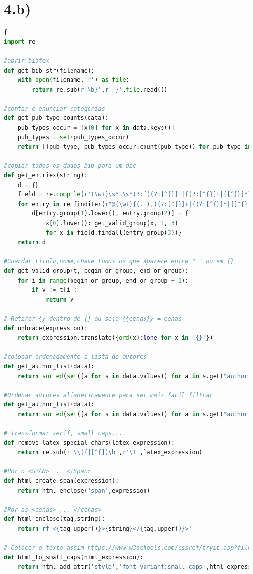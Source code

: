 \documentclass[11pt,a4paper]{report}
\begin{document}
\section{4.b)}
\begin{lstlisting}[language=python]{
import re

#abrir bibtex
def get_bib_str(filename):
    with open(filename,'r') as file:
        return re.sub(r'\b}',r' }',file.read())

#contar e enunciar categorias
def get_pub_type_counts(data):
    pub_types_occur = [x[0] for x in data.keys()]
    pub_types = set(pub_types_occur)
    return [(pub_type, pub_types_occur.count(pub_type)) for pub_type in pub_types]

#copiar todos os dados bib para um dic
def get_entries(string):
    d = {}
    field = re.compile(r'(\w+)\s*=\s*(?:{((?:[^{}]+|{(?:[^{}]+|{[^{}]*})+})+)}|"([^"]+)"|(\d+))')
    for entry in re.finditer(r"@(\w+){(.+),((?:[^{}]+|{(?:[^{}]*|{[^{}]*})+})+)", string):
        d[entry.group(1).lower(), entry.group(2)] = {
            x[0].lower(): get_valid_group(x, 1, 3)
            for x in field.findall(entry.group(3))}
    return d

#Guardar titulo,nome,chave todos os que aparece entre " " ou em {}
def get_valid_group(t, begin_or_group, end_or_group):
    for i in range(begin_or_group, end_or_group + 1):
        if v := t[i]:
            return v

# Retirar {} dentro de {} ou seja {{cenas}} = cenas
def unbrace(expression):
    return expression.translate({ord(x):None for x in '{}'})

#colocar ordenadamente a lista de autores 
def get_author_list(data):
    return sorted(set([a for s in data.values() for a in s.get("author", [])]))

#Ordenar autores alfabeticamente para ser mais facil filtrar
def get_author_list(data):
    return sorted(set([a for s in data.values() for a in s.get("author", [])]))

# Transformar serif, small caps,... 
def remove_latex_special_chars(latex_expression):
    return re.sub(r'\\({|[^{])\b',r'\1',latex_expression)

#Por o <SPAN> ... </Span>
def html_create_span(expression):
    return html_enclose('span',expression)

#Por as <cenas> ... </cenas>
def html_enclose(tag,string):
    return rf'<{tag.upper()}>{string}</{tag.upper()}>'

# Colocar o texto assim https://www.w3schools.com/cssref/tryit.asp?filename=trycss_font-variant
def html_to_small_caps(html_expression):
    return html_add_attr('style','font-variant:small-caps',html_expression)


\end{lstlisting}
\end{document}
